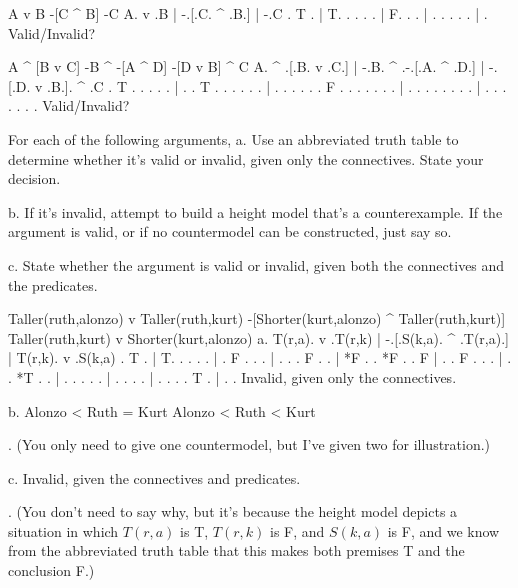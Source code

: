 \argument
 A v B
 -[C ^ B]
\argumentline
 -C
\endargument
	\answer
	\truthtable
	 A. v .B | -.[.C. ^ .B.] | -.C
	\truthtableline
	  . T .  | T. . .   . .  | F.
	  .   .  |  . . .   . .  |  .
	\endtruthtable
	Valid/Invalid?
	\endanswer

\argument
 A ^ [B v C]
 -B ^ -[A ^ D]
\argumentline
 -[D v B] ^ C
\endargument
	\answer
	\truthtable
	 A. ^ .[.B. v .C.] | -.B. ^ .-.[.A. ^ .D.] | -.[.D. v .B.]. ^ .C
	\truthtableline
	  . T . . .   . .  |  . . T . . . .   . .  |  . . .   . . . F . 
	  .   . . .   . .  |  . .   . . . .   . .  |  . . .   . . .   . 
	\endtruthtable
	Valid/Invalid?
	\endanswer

\endproblems

For each of the following arguments,
\list
a. Use an abbreviated truth table to determine whether it's valid or invalid, given only the connectives. State your decision.

b. If it's invalid, attempt to build a height model that's a counterexample. If the argument is valid, or if no countermodel can be constructed, just say so.

c. State whether the argument is valid or invalid, given both the connectives and the predicates.
\endlist

\problems
{}
\argument
 Taller(ruth,alonzo) v Taller(ruth,kurt)
 -[Shorter(kurt,alonzo) ^ Taller(ruth,kurt)]
\argumentline
 Taller(ruth,kurt) v Shorter(kurt,alonzo)
\endargument
	\answerlist
	a.
	\truthtable
	 T(r,a). v .T(r,k) | -.[.S(k,a). ^ .T(r,a).] | T(r,k). v .S(k,a)
	\truthtableline
	       . T .       | T. .      .   .      .  |       . F .
	       .   .       |  . .      . F .      .  |   *F  .   .  *F
	       .   .   F   |  . . F    .   .      .  |       .   .
	   *T  .   .       |  . .      .   .      .  |       .   .
	       .   .       |  . .      .   .   T  .  |       .   .
	\endtruthtable
	Invalid, given only the connectives.

	b.
	\heightmodel
	 Alonzo < Ruth = Kurt
	\endheightmodel
	\OR
	\heightmodel
	 Alonzo < Ruth < Kurt
	\endheightmodel

.	(You only need to give one countermodel, but I've given two for illustration.)

	c. Invalid, given the connectives and predicates.

.	(You don't need to say why, but it's because the height model depicts a situation in which $T(r,a)$ is T, $T(r,k)$ is F, and $S(k,a)$ is F, and we know from the abbreviated truth table that this makes both premises T and the conclusion F.)

